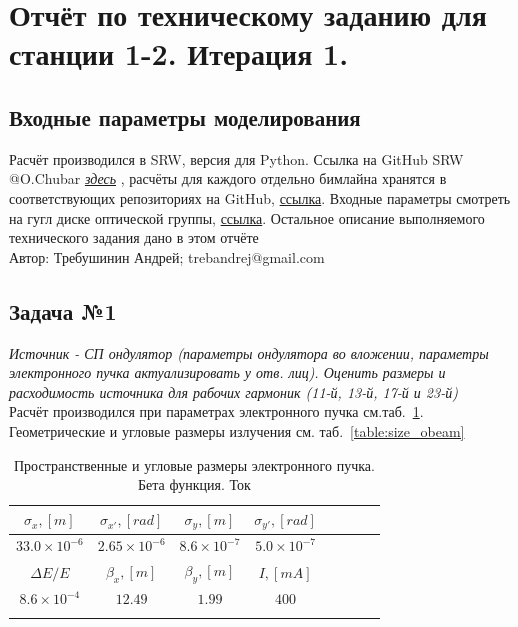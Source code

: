 \documentclass[14pt,a4paper]{extarticle}
\numberwithin{equation}{section}
\begin{document}
	
	\section{Отчёт по техническому заданию для станции 1-2. Итерация 1.}
	\subsection{Входные параметры моделирования}
	Расчёт производился в SRW, версия для Python. Ссылка на GitHub SRW @O.Chubar \textit{\href{https://github.com/ochubar/SRW.git}{здесь}} , расчёты для каждого отдельно бимлайна хранятся в соответствующих репозиториях на GitHub, {\href{https://github.com/TrebAndrew/thesis_andrei.git}{ссылка}}. Входные параметры смотреть на гугл диске оптической группы, {\href{https://drive.google.com/open?id=1zY-qElVNPh--SjBYmQvyMo7WluX_Am-s}{ссылка}}. Остальное описание выполняемого технического задания дано в этом отчёте\\
	Автор: Требушинин Андрей; trebandrej@gmail.com
	
	\subsection{Задача №1}
	\textit{Источник - СП ондулятор (параметры ондулятора во вложении, параметры электронного пучка актуализировать у отв. лиц). Оценить размеры и расходимость источника для рабочих гармоник (11-й, 13-й, 17-й и 23-й)}\\
	Расчёт производился при параметрах электронного пучка см.таб.~\ref{table:ebeam}. Геометрические и угловые размеры излучения см. таб.~\ref{table:size_obeam}\\
	\begin{table}[h!]
		\centering
		\begin{tabular}{cccccccc}
			\hline
			\toprule
			\rule{0pt}{3ex}   $\sigma_x, [m]$ & $\sigma_{x'}, [rad]$ & $\sigma_y, [m]$     & $\sigma_{y'}, [rad]$ \\ \hline
			\rule{0pt}{3ex}   $33.0 \times 10^{-6}$  & $2.65 \times 10^{-6}$  &  $8.6 \times 10^{-7}$ & $5.0 \times 10^{-7}$   \\
			\hline	\hline
			\rule{0pt}{3ex}   $\Delta E / E$ & $\beta_x,[m]$ & $\beta_y,[m]$   & $I,[mA]$\\ \hline
			\rule{0pt}{3ex}	 $8.6 \times 10^{-4}$ & $12.49$ & $1.99$ & $400$ \\ \hline
			\toprule
			\rule{0pt}{4ex}
		\end{tabular}
		\caption{Пространственные и угловые размеры электронного пучка. Бета функция. Ток}
		\label{table:ebeam}
	\end{table}
	
\end{document}
